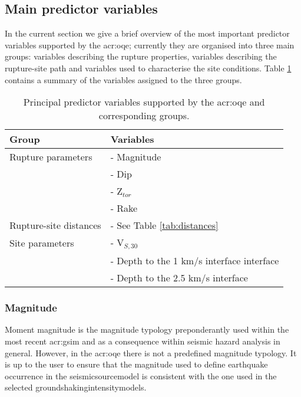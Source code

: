 \subsection{Main predictor variables}
In the current section we give a brief overview of the most important predictor 
variables \parencite[for a summary, see][]{akkar2013r} supported by the 
\gls{acr:oqe}; currently they are organised into three main groups: variables 
describing the rupture properties, variables describing the rupture\--site 
path and variables used to characterise the site conditions. 
%
Table \ref{tab:parameters} contains a summary of the variables
assigned to the three groups.
\begin{table}[!h]
\centering
\begin{tabular}{|p{5cm}p{8cm}|}
\hline
\rowcolor{anti-flashwhite}
\bf{Group} & \bf{Variables} \\
\hline 
Rupture parameters & - Magnitude\\
                   & - Dip \\ 
                   & - Z$_{tor}$ \\ 
                   & - Rake \\ \hline
Rupture-site distances & - See Table \ref{tab:distances} \\ \hline
Site parameters & - V$_{S,30}$ \\
                & - Depth to the 1 km/s interface interface \\
                & - Depth to the 2.5 km/s interface \\ 
\hline
\end{tabular}
\caption{Principal predictor variables supported by the \gls{acr:oqe} and 
    corresponding groups.}
\label{tab:parameters}
\end{table}
%
\subsubsection{Magnitude}
Moment magnitude \parencite{hanks1979} is the magnitude typology 
preponderantly used within the most recent \gls{acr:gsim} and as a 
consequence within seismic hazard analysis in general. 
%
However, in the \gls{acr:oqe} there is not a predefined magnitude typology.
It is up to the user to ensure that the magnitude used to define earthquake 
occurrence in the \gls{seismicsourcemodel} is consistent with the one used 
in the selected \glspl{groundshakingintensitymodel}.
%
